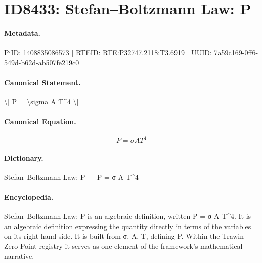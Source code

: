 \section*{ID8433: Stefan–Boltzmann Law: P}
\paragraph{Metadata.}
PiID: 1408835086573 | RTEID: RTE:P32747.2118:T3.6919 | UUID: 7a59c169-0ff6-549d-b62d-ab507fe219c0

\paragraph{Canonical Statement.}
\textbackslash{}[ P = \textbackslash{}sigma A T\textasciicircum{}4 \textbackslash{}]

\paragraph{Canonical Equation.}
\[
P = \sigma A T^4
\]

\paragraph{Dictionary.}
Stefan–Boltzmann Law: P — P = σ A T\textasciicircum{}4

\paragraph{Encyclopedia.}
Stefan–Boltzmann Law: P is an algebraic definition, written P = σ A T\textasciicircum{}4. It is an algebraic definition expressing the quantity directly in terms of the variables on its right-hand side. It is built from σ, A, T, defining P. Within the Trawin Zero Point registry it serves as one element of the framework's mathematical narrative.
